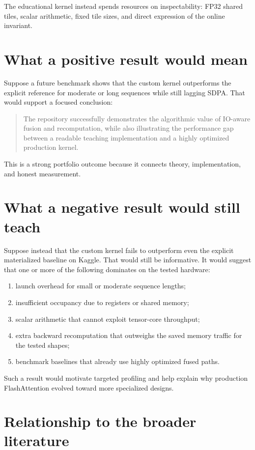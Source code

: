 The educational kernel instead spends resources on inspectability: FP32 shared tiles, scalar arithmetic, fixed tile sizes, and direct expression of the online invariant.

\section{What a positive result would mean}

Suppose a future benchmark shows that the custom kernel outperforms the explicit reference for moderate or long sequences while still lagging SDPA. That would support a focused conclusion:
\begin{quote}
The repository successfully demonstrates the algorithmic value of IO-aware fusion and recomputation, while also illustrating the performance gap between a readable teaching implementation and a highly optimized production kernel.
\end{quote}
This is a strong portfolio outcome because it connects theory, implementation, and honest measurement.

\section{What a negative result would still teach}

Suppose instead that the custom kernel fails to outperform even the explicit materialized baseline on Kaggle. That would still be informative. It would suggest that one or more of the following dominates on the tested hardware:
\begin{enumerate}
  \item launch overhead for small or moderate sequence lengths;
  \item insufficient occupancy due to registers or shared memory;
  \item scalar arithmetic that cannot exploit tensor-core throughput;
  \item extra backward recomputation that outweighs the saved memory traffic for the tested shapes;
  \item benchmark baselines that already use highly optimized fused paths.
\end{enumerate}
Such a result would motivate targeted profiling and help explain why production FlashAttention evolved toward more specialized designs.

\section{Relationship to the broader literature}

